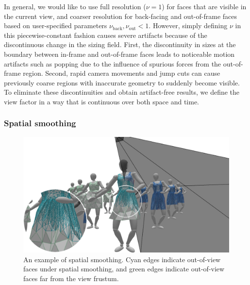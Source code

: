 \documentclass[10pt,journal,compsoc,twoside]{TexInputs/IEEEtran}
\begin{document}
In general, we would like to use full resolution ($\nu=1$) for faces that are visible
in the current view, and coarser resolution for back-facing and out-of-frame faces based on user-specified parameters $\nu_{\text{back}}, \nu_{\text{out}} < 1$.
However, simply defining $\nu$ in this piecewise-constant
fashion causes severe artifacts because of the discontinuous change in the sizing
field.
First, the discontinuity in sizes at the boundary between in-frame and out-of-frame faces leads to noticeable motion artifacts such as popping due to the influence of spurious forces from the out-of-frame region.
Second, rapid camera movements and jump cuts can cause previously coarse regions with inaccurate geometry to suddenly become visible.
To
eliminate these discontinuities and obtain artifact-free results, we define the
view factor in a way that is continuous over both space and time.

\subsubsection{Spatial smoothing}

\begin{figure}[t]
    \centering
    \includegraphics[width=1.0\columnwidth]{spatial_smoothing/spatial_smoothing}
    \caption{An example of spatial smoothing. Cyan edges indicate out-of-view faces
    under spatial smoothing, and green edges indicate out-of-view faces far from the view frustum.}
    \label{fig:spatial_smoothing}
\end{figure}
\end{document}
